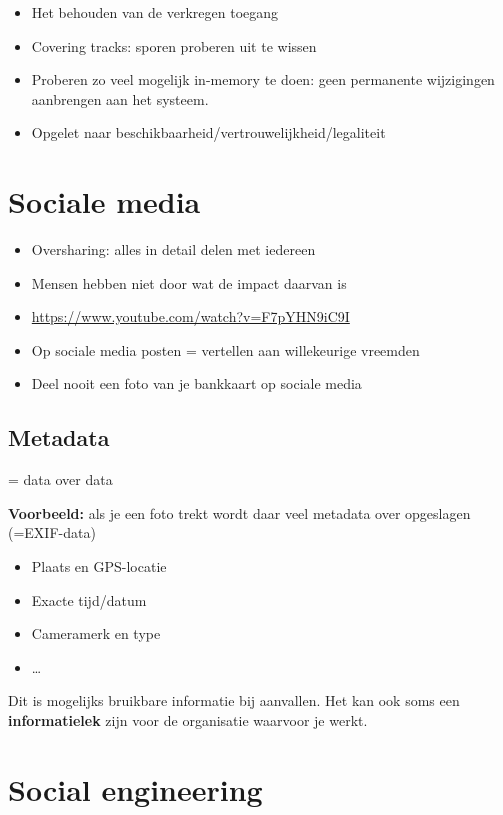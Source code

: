 \documentclass{article}
\newcommand{\bold}[1]{\textbf{#1}}
\begin{document}
\begin{itemize}
    \item Het behouden van de verkregen toegang
    \item Covering tracks: sporen proberen uit te wissen
    \item Proberen zo veel mogelijk in-memory te doen: geen permanente wijzigingen aanbrengen aan het systeem.  
    \item Opgelet naar beschikbaarheid/vertrouwelijkheid/legaliteit
\end{itemize}

\section{Sociale media}

\begin{itemize}
    \item Oversharing: alles in detail delen met iedereen
    \item Mensen hebben niet door wat de impact daarvan is
    \item \url{https://www.youtube.com/watch?v=F7pYHN9iC9I}
    \item Op sociale media posten = vertellen aan willekeurige vreemden
    \item Deel nooit een foto van je bankkaart op sociale media
\end{itemize}

\subsection{Metadata}

= data over data

\bold{Voorbeeld:} als je een foto trekt wordt daar veel metadata over opgeslagen (=EXIF-data)

\begin{itemize}
    \item Plaats en GPS-locatie
    \item Exacte tijd/datum
    \item Cameramerk en type
    \item \dots
\end{itemize}

Dit is mogelijks bruikbare informatie bij aanvallen. 
Het kan ook soms een \bold{informatielek} zijn voor de organisatie waarvoor je werkt.

\section{Social engineering}
\end{document}
